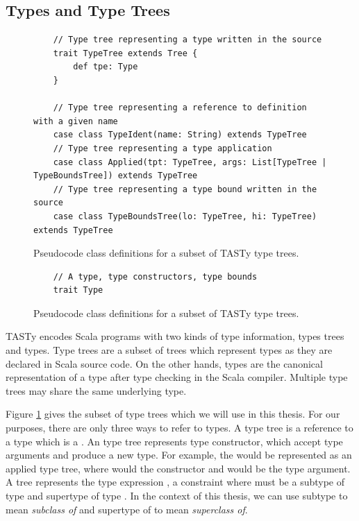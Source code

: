 \subsection{Types and Type Trees}
\begin{figure}[!htb]
	\begin{verbatim}
	// Type tree representing a type written in the source
	trait TypeTree extends Tree {
		def tpe: Type
	}
	
	// Type tree representing a reference to definition with a given name
	case class TypeIdent(name: String) extends TypeTree 
	// Type tree representing a type application
	case class Applied(tpt: TypeTree, args: List[TypeTree | TypeBoundsTree]) extends TypeTree
	// Type tree representing a type bound written in the source
	case class TypeBoundsTree(lo: TypeTree, hi: TypeTree) extends TypeTree
	\end{verbatim} 
	\caption{Pseudocode class definitions for a subset of TASTy type trees.}
	\label{tasty:type-trees}
\end{figure}


\begin{figure}[!htb]
	\begin{verbatim}
	// A type, type constructors, type bounds
	trait Type 
	\end{verbatim} 
	\caption{Pseudocode class definitions for a subset of TASTy type trees.}
	\label{tasty:types}
\end{figure}
TASTy encodes Scala programs with two kinds of type information, types trees and types.
Type trees are a subset of trees which represent types as they are declared in Scala source code.
On the other hands, types are the canonical representation of a type after type checking in the Scala compiler.
Multiple type trees may share the same underlying type.


Figure \ref{tasty:type-trees} gives the subset of type trees which we will use in this thesis.
For our purposes, there are only three ways to refer to types.
A  type tree is a reference to a type which is a .
An  type tree represents type constructor, which accept type arguments and produce a new type.
For example, the  would be represented as an applied type tree, where  would the constructor and  would be the type argument.
A  tree represents the type expression , a constraint where  must be a subtype of type  and supertype of type .
In the context of this thesis, we can use subtype to mean \textit{subclass of} and supertype of to mean \textit{superclass of}.

